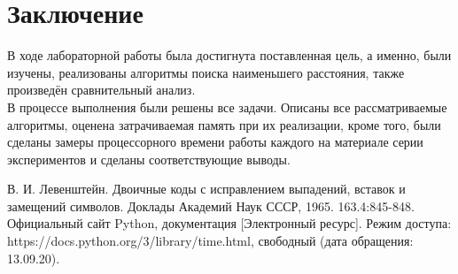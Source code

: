 \documentclass[12pt]{report}
\begin{document}
\chapter*{Заключение}
В ходе лабораторной работы была достигнута поставленная цель, а именно, были изучены, реализованы алгоритмы поиска наименьшего расстояния, также произведён сравнительный анализ. \\

В процессе выполнения были решены все задачи. Описаны все рассматриваемые алгоритмы, оценена затрачиваемая память при их реализации, кроме того, были сделаны замеры процессорного времени работы каждого на материале серии экспериментов и сделаны соответствующие выводы.


\begin{thebibliography}{2}
	 В. И. Левенштейн. Двоичные коды с исправлением выпадений, вставок и замещений символов. Доклады Академий Наук СССР, 1965. 163.4:845-848.
	 Официальный сайт Python, документация [Электронный ресурс]. Режим доступа: https://docs.python.org/3/library/time.html, свободный (дата обращения: 13.09.20).
\end{thebibliography}
\end{document}
